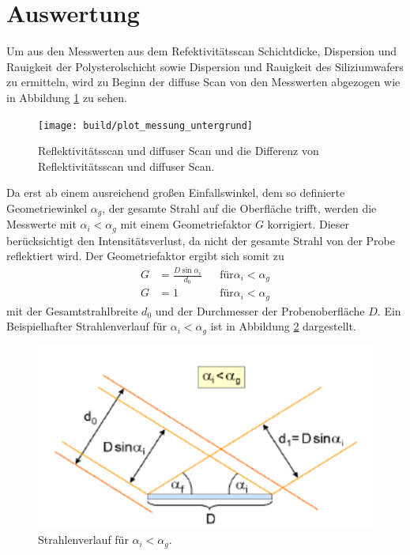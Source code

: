 \section{Auswertung}
\label{sec:Auswertung}
Um aus den Messwerten aus dem Refektivitätsscan Schichtdicke, Dispersion
und Rauigkeit der Polysterolschicht sowie Dispersion und Rauigkeit des Siliziumwafers
zu ermitteln, wird
zu Beginn der diffuse Scan von den Messwerten abgezogen wie in Abbildung
\ref{fig:diffuse_Scan} zu sehen.

\begin{figure}
  \centering
  \texttt{[image: build/plot\_messung\_untergrund]}
  \caption{Reflektivitätsscan und diffuser Scan und die Differenz von Reflektivitätsscan und diffuser Scan.}
  \label{fig:diffuse_Scan}
\end{figure}

Da erst ab einem ausreichend großen Einfallswinkel,
dem so definierte Geometriewinkel $\alpha_g$,
der gesamte Strahl auf die Oberfläche trifft,
werden die Messwerte mit $\alpha_i < \alpha_g$
mit einem Geometriefaktor $G$ korrigiert.
Dieser berücksichtigt den Intensitätsverlust, da
nicht der gesamte Strahl von der Probe reflektiert wird.
Der Geometriefaktor ergibt sich somit zu
\begin{align}
G&=\frac{D\sin\alpha_i}{d_0} &  &\text{für} \alpha_i<\alpha_g \\
G&=1 & &\text{für} \alpha_i<\alpha_g
\end{align}
mit der Gesamtstrahlbreite $d_0$ und der Durchmesser der Probenoberfläche $D$.
Ein Beispielhafter Strahlenverlauf für $\alpha_i<\alpha_g$ ist in Abbildung \ref{fig:geo}
dargestellt.
\begin{figure}
  \centering
  \includegraphics{bilder/geo_winkel.PNG}
  \caption{Strahlenverlauf für $\alpha_i<\alpha_g$. \cite{sample}}
  \label{fig:geo}
\end{figure}

